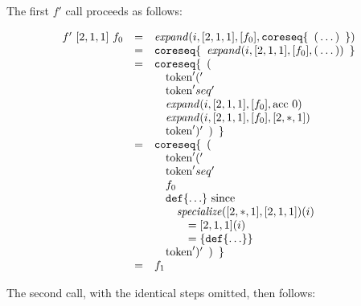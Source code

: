 \documentclass{kththesis}
\begin{document}
The first $f'$ call proceeds as follows:

$$
\begin{array}{rcl}
f'~[2, 1, 1]~f_0 & = & \mathit{expand}(i, [2, 1, 1], [f_0], \text{\texttt{coreseq}}\{\enspace \text{(}\ldots\text{)} \enspace \}) \\
& = & \text{\texttt{coreseq}}\{ \enspace \mathit{expand}(i, [2, 1, 1], [f_0], \text{(} \ldots \text{)}) \enspace \} \\
& = & \text{\texttt{coreseq}}\{ \enspace \text{(} \\
& & \quad \text{token}'(' \\
& & \quad \text{token}'seq' \\
& & \quad \mathit{expand}(i, [2, 1, 1], [f_0], \text{acc}~0) \\
& & \quad \mathit{expand}(i, [2, 1, 1], [f_0], [2, *, 1]) \\
& & \quad \text{token}')' \enspace \text{)} \enspace \} \\
& = & \text{\texttt{coreseq}}\{ \enspace \text{(} \\
& & \quad \text{token}'(' \\
& & \quad \text{token}'seq' \\
& & \quad f_0 \\
& & \quad \text{\texttt{def}}\{\ldots\} \text{ since} \\
& & \qquad \mathit{specialize}([2, *, 1], [2, 1, 1])(i) \\
& & \qquad \quad = [2, 1, 1](i) \\
& & \qquad \quad = \{\text{\texttt{def}}\{\ldots\}\} \\
& & \quad \text{token}')' \enspace \text{)} \enspace \} \\
& = & f_1 \\
\end{array}
$$

The second call, with the identical steps omitted, then follows:
\end{document}
